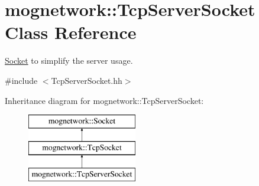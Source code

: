 \hypertarget{classmognetwork_1_1_tcp_server_socket}{\section{mognetwork\-:\-:Tcp\-Server\-Socket Class Reference}
\label{classmognetwork_1_1_tcp_server_socket}
}


\hyperlink{classmognetwork_1_1_socket}{Socket} to simplify the server usage.  




{\ttfamily \#include $<$Tcp\-Server\-Socket.\-hh$>$}

Inheritance diagram for mognetwork\-:\-:Tcp\-Server\-Socket\-:\begin{figure}[H]
\begin{center}
\leavevmode
\includegraphics[height=3.000000cm]{classmognetwork_1_1_tcp_server_socket}
\end{center}
\end{figure}
